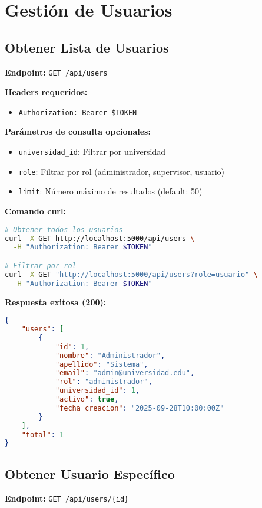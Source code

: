 \documentclass[12pt,a4paper]{article}
\begin{document}
\section{Gestión de Usuarios}

\subsection{Obtener Lista de Usuarios}

\textbf{Endpoint:} \texttt{GET /api/users}

\textbf{Headers requeridos:}
\begin{itemize}
\item \texttt{Authorization: Bearer \$TOKEN}
\end{itemize}

\textbf{Parámetros de consulta opcionales:}
\begin{itemize}
\item \texttt{universidad\_id}: Filtrar por universidad
\item \texttt{role}: Filtrar por rol (administrador, supervisor, usuario)
\item \texttt{limit}: Número máximo de resultados (default: 50)
\end{itemize}

\textbf{Comando curl:}
\begin{lstlisting}[language=bash]
# Obtener todos los usuarios
curl -X GET http://localhost:5000/api/users \
  -H "Authorization: Bearer $TOKEN"

# Filtrar por rol
curl -X GET "http://localhost:5000/api/users?role=usuario" \
  -H "Authorization: Bearer $TOKEN"
\end{lstlisting}

\textbf{Respuesta exitosa (200):}
\begin{lstlisting}[language=JSON]
{
    "users": [
        {
            "id": 1,
            "nombre": "Administrador",
            "apellido": "Sistema",
            "email": "admin@universidad.edu",
            "rol": "administrador",
            "universidad_id": 1,
            "activo": true,
            "fecha_creacion": "2025-09-28T10:00:00Z"
        }
    ],
    "total": 1
}
\end{lstlisting}

\subsection{Obtener Usuario Específico}

\textbf{Endpoint:} \texttt{GET /api/users/\{id\}}
\end{document}
